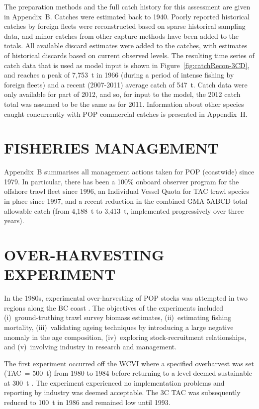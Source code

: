 The preparation methods and the full catch history for this assessment are given in Appendix~B. Catches were estimated back to 1940. Poorly reported historical catches by foreign fleets were reconstructed based on sparse historical sampling data, and minor catches from other capture methods have been added to the totals. All available discard estimates were added to the catches, with estimates of historical discards based on current observed levels. The resulting time series of catch data that is used as model input is shown in Figure~\ref{fig:catchRecon-3CD}, and reaches a peak of 7,753~t in 1966 (during a period of intense fishing by foreign fleets) and a recent (2007-2011) average catch of 547~t. Catch data were only available for part of 2012, and so, for input to the model, the 2012 catch total was assumed to be the same as for 2011. Information about other species caught concurrently with POP commercial catches is presented in Appendix~H.

\section{FISHERIES MANAGEMENT}

Appendix~B summarises all management actions taken for POP (coastwide) since 1979. In particular, there has been a 100\% onboard observer program for the offshore trawl fleet since 1996, an Individual Vessel Quota for TAC trawl species in place since 1997, and a recent reduction in the combined GMA 5ABCD total allowable catch (from 4,188~t to 3,413~t, implemented progressively over three years).

\vspace{15mm}   %

\section{OVER-HARVESTING EXPERIMENT}

In the 1980s, experimental over-harvesting of POP stocks was attempted in two regions along the BC coast \citep{ls93, leam98}. The objectives of the experiments included (i)~ground-truthing trawl survey biomass estimates, (ii)~estimating fishing mortality, (iii)~validating ageing techniques by introducing a large negative anomaly in the age composition, (iv)~exploring stock-recruitment relationships, and (v)~involving industry in research and management.

The first experiment occurred off the WCVI where a specified overharvest was set (TAC~= 500~t) from 1980 to 1984 before returning to a level deemed sustainable at 300~t \citep{stoc81}. The experiment experienced no implementation problems and reporting by industry was deemed acceptable. The 3C TAC was subsequently reduced to 100~t in 1986 and remained low until 1993. 

